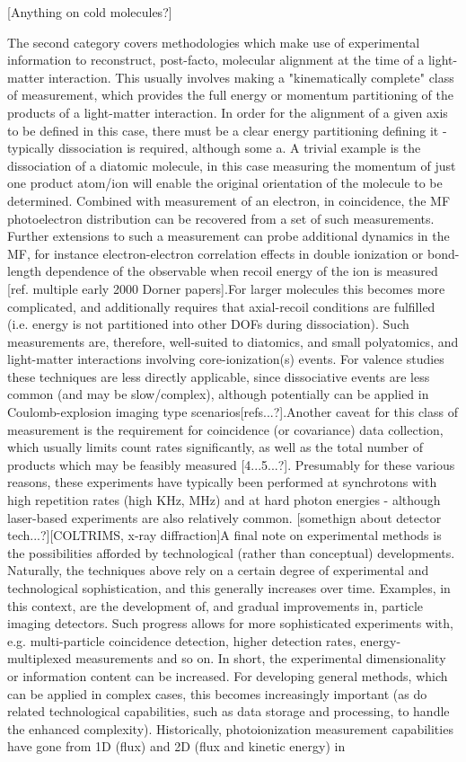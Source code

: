 [Anything on cold molecules?]

The second category covers methodologies which make use of experimental information to reconstruct, post-facto, molecular alignment at the time of a light-matter interaction. This usually involves making a "kinematically complete" class of measurement, which provides the full energy or momentum partitioning of the products of a light-matter interaction. In order for the alignment of a given axis to be defined in this case, there must be a clear energy partitioning defining it - typically dissociation is required, although some a. A trivial example is the dissociation of a diatomic molecule, in this case measuring the momentum of just one product atom/ion will enable the original orientation of the molecule to be determined. Combined with measurement of an electron, in coincidence, the MF photoelectron distribution can be recovered from a set of such measurements. Further extensions to such a measurement can probe additional dynamics in the MF, for instance electron-electron correlation effects in double ionization or bond-length dependence of the observable when recoil energy of the ion is measured [ref. multiple early 2000 Dorner papers].For larger molecules this becomes more complicated, and additionally requires that axial-recoil conditions are fulfilled (i.e. energy is not partitioned into other DOFs during dissociation). Such measurements are, therefore, well-suited to diatomics, and small polyatomics, and light-matter interactions involving core-ionization(s) events. For valence studies these techniques are less directly applicable, since dissociative events are less common (and may be slow/complex), although potentially can be applied in Coulomb-explosion imaging type scenarios[refs...?].Another caveat for this class of measurement is the requirement for coincidence (or covariance) data collection, which usually limits count rates significantly, as well as the total number of products which may be feasibly measured [4...5...?]. Presumably for these various reasons, these experiments have typically been performed at synchrotons with high repetition rates (high KHz, MHz) and at hard photon energies - although laser-based experiments are also relatively common. [somethign about detector tech...?][COLTRIMS, x-ray diffraction]A final note on experimental methods is the possibilities afforded by technological (rather than conceptual) developments. Naturally, the techniques above rely on a certain degree of experimental and technological sophistication, and this generally increases over time. Examples, in this context, are the development of, and gradual improvements in, particle imaging detectors. Such progress allows for more sophisticated experiments with, e.g. multi-particle coincidence detection, higher detection rates, energy-multiplexed measurements and so on. In short, the experimental dimensionality or information content can be increased. For developing general methods, which can be applied in complex cases, this becomes increasingly important (as do related technological capabilities, such as data storage and processing, to handle the enhanced complexity). Historically, photoionization measurement capabilities have gone from 1D (flux) and 2D (flux and kinetic energy) in 